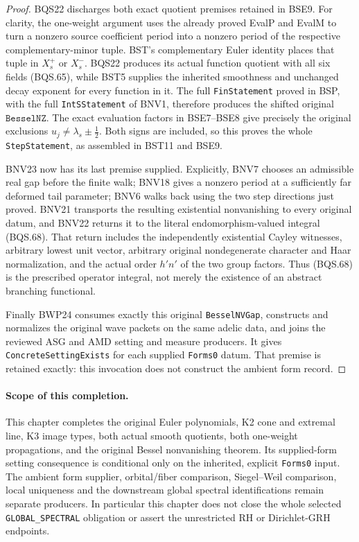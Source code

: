 \begin{proof}
BQS22 discharges both exact quotient premises retained in BSE9.
For clarity, the one-weight argument uses the already proved
EvalP and EvalM to turn a nonzero source coefficient period
into a nonzero period of the respective complementary-minor
tuple.  BST's complementary Euler identity places that tuple
in $X_s^+$ or $X_s^-$.
BQS22 produces its actual function quotient with all six fields
(BQS.65), while BST5 supplies the inherited smoothness and
unchanged decay exponent for every function in it.
The full \texttt{FinStatement} proved in BSP, with the full
\texttt{IntSStatement} of BNV1, therefore produces the shifted
original $\texttt{BesselNZ}$.
The exact evaluation factors in BSE7--BSE8 give precisely the
original exclusions $u_j\ne\lambda_s\pm\tfrac12$.
Both signs are included, so this proves the whole
\texttt{StepStatement}, as assembled in BST11 and BSE9.

BNV23 now has its last premise supplied.
Explicitly, BNV7 chooses an admissible real gap before the finite
walk; BNV18 gives a nonzero period at a sufficiently far deformed
tail parameter; BNV6 walks back using the two step directions
just proved.  BNV21 transports the resulting existential
nonvanishing to every original datum, and BNV22 returns it to
the literal endomorphism-valued integral (BQS.68).
That return includes the independently existential Cayley
witnesses, arbitrary lowest unit vector, arbitrary original
nondegenerate character and Haar normalization, and the
actual order $h'n'$ of the two group factors.
Thus (BQS.68) is the prescribed operator integral, not merely
the existence of an abstract branching functional.

Finally BWP24 consumes exactly this original
\texttt{BesselNVGap}, constructs and normalizes the original
wave packets on the same adelic data, and joins the reviewed
ASG and AMD setting and measure producers.
It gives \texttt{ConcreteSettingExists} for each supplied
\texttt{Forms0} datum.  That premise is retained exactly:
this invocation does not construct the ambient form record.
\end{proof}

\paragraph{Scope of this completion.}
This chapter completes the original Euler polynomials, K2 cone and
extremal line, K3 image types, both actual smooth quotients,
both one-weight propagations, and the original Bessel nonvanishing
theorem.  Its supplied-form setting consequence is conditional only
on the inherited, explicit \texttt{Forms0} input.
The ambient form supplier, orbital/fiber comparison, Siegel--Weil
comparison, local uniqueness and the downstream global spectral
identifications remain separate producers.
In particular this chapter does not close the whole selected
\texttt{GLOBAL\_SPECTRAL} obligation or assert the unrestricted
RH or Dirichlet-GRH endpoints.
